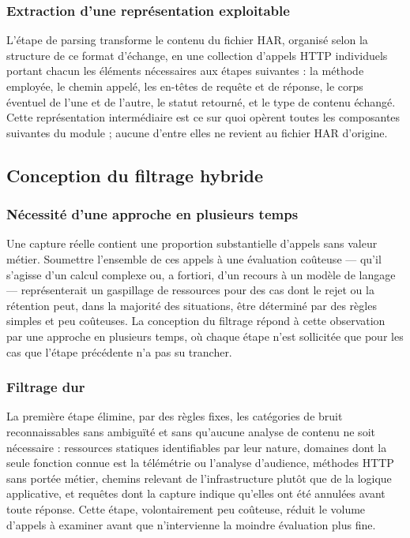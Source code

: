 \subsubsection{Extraction d'une représentation exploitable}

L'étape de parsing transforme le contenu du fichier HAR, organisé selon la structure de ce format d'échange, en une collection d'appels HTTP individuels portant chacun les éléments nécessaires aux étapes suivantes : la méthode employée, le chemin appelé, les en-têtes de requête et de réponse, le corps éventuel de l'une et de l'autre, le statut retourné, et le type de contenu échangé. Cette représentation intermédiaire est ce sur quoi opèrent toutes les composantes suivantes du module ; aucune d'entre elles ne revient au fichier HAR d'origine.

\subsection{Conception du filtrage hybride}
\label{ssec:filtrage-hybride}

\subsubsection{Nécessité d'une approche en plusieurs temps}

Une capture réelle contient une proportion substantielle d'appels sans valeur métier. Soumettre l'ensemble de ces appels à une évaluation coûteuse — qu'il s'agisse d'un calcul complexe ou, a fortiori, d'un recours à un modèle de langage — représenterait un gaspillage de ressources pour des cas dont le rejet ou la rétention peut, dans la majorité des situations, être déterminé par des règles simples et peu coûteuses. La conception du filtrage répond à cette observation par une approche en plusieurs temps, où chaque étape n'est sollicitée que pour les cas que l'étape précédente n'a pas su trancher.

\subsubsection{Filtrage dur}

La première étape élimine, par des règles fixes, les catégories de bruit reconnaissables sans ambiguïté et sans qu'aucune analyse de contenu ne soit nécessaire : ressources statiques identifiables par leur nature, domaines dont la seule fonction connue est la télémétrie ou l'analyse d'audience, méthodes HTTP sans portée métier, chemins relevant de l'infrastructure plutôt que de la logique applicative, et requêtes dont la capture indique qu'elles ont été annulées avant toute réponse. Cette étape, volontairement peu coûteuse, réduit le volume d'appels à examiner avant que n'intervienne la moindre évaluation plus fine.

